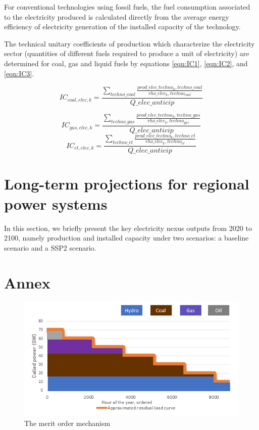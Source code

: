 For conventional technologies using fossil fuels, the fuel consumption associated to the electricity produced is calculated directly from the average energy efficiency of electricity generation of the installed capacity of the technology.

The technical unitary coefficients of production which characterize the electricity sector (quantities of different fuels required to produce a unit of electricity) are determined for coal, gas and liquid fuels by equations \ref{eqn:IC1}, \ref{eqn:IC2}, and  \ref{eqn:IC3}.

\begin{equation}
    IC_{coal,elec,k} = \frac{\sum_{techno\_coal}  \frac{prod\_elec\_techno_k,techno\_coal}{rho\_elec_k,techno_{coal}}}{Q\_elec\_anticip}
    \label{eqn:IC1}
\end{equation}

\begin{equation}
    IC_{gas,elec,k} = \frac{\sum_{techno\_gas}  \frac{prod\_elec\_techno_k,techno\_gas}{rho\_elec_k,techno_{gas}}}{Q\_elec\_anticip}
    \label{eqn:IC2}
\end{equation}
\begin{equation}
    IC_{et,elec,k} = \frac{\sum_{techno\_et}  \frac{prod\_elec\_techno_k,techno\_et}{rho\_elec_k,techno_{et}}}{Q\_elec\_anticip}
    \label{eqn:IC3}
\end{equation}

\section{Long-term projections for regional power systems}
In this section, we briefly present the key electricity nexus outputs from 2020 to 2100, namely production and installed capacity under two scenarios: a baseline scenario and a SSP2 scenario.

\newpage
\section{Annex}

\begin{figure}[H]
    \centering
    \includegraphics{figures&tables/dispatch.png}
    \caption{The merit order mechanism}
    \label{fig:dispatch}
\end{figure}

